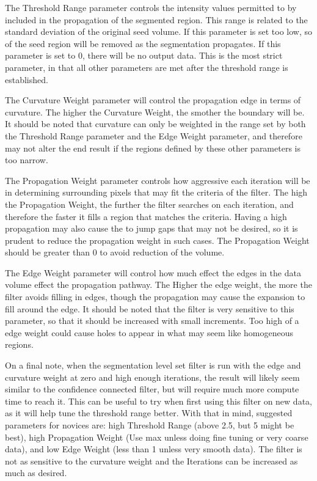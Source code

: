 \documentclass[fleqn,11pt,openany]{book}
\begin{document}
The Threshold Range parameter controls the intensity values permitted to by included in the propagation of the segmented region.  This range is related to the standard deviation of the original seed volume.  If this parameter is set too low, so of the seed region will be removed as the segmentation propagates.  If this parameter is set to 0, there will be no output data.  This is the most strict parameter, in that all other parameters are met after the threshold range is established.  

The Curvature Weight parameter will control the propagation edge in terms of curvature.  The higher the Curvature Weight, the smother the boundary will be.  It should be noted that curvature can only be weighted in the range set by both the Threshold Range parameter and the Edge Weight parameter, and therefore may not alter the end result if the regions defined by these other parameters is too narrow.  

The Propagation Weight parameter controls how aggressive each iteration will be in determining surrounding pixels that may fit the criteria of the filter.  The high the Propagation Weight, the further the filter searches on each iteration, and therefore the faster it fills a region that matches the criteria. Having a high propagation may also cause the to jump gaps that may not be desired, so it is prudent to reduce the propagation weight in such cases.  The Propagation Weight should be greater than 0 to avoid reduction of the volume.  

The Edge Weight parameter will control how much effect the edges in the data volume effect the propagation pathway.  The Higher the edge weight, the more the filter avoids filling in edges, though the propagation may cause the expansion to fill around the edge.  It should be noted that the filter is very sensitive to this parameter, so that it should be increased with small increments.  Too high of a edge weight could cause holes to appear in what may seem like homogeneous regions.  

On a final note, when the segmentation level set filter is run with the edge and curvature weight at zero and high enough iterations, the result will likely seem similar to the confidence connected filter, but will require much more compute time to reach it.  This can be useful to try when first using this filter on new data, as it will help tune the threshold range better.  With that in mind, suggested parameters for novices are: high Threshold Range (above 2.5, but 5 might be best), high Propagation Weight (Use max unless doing fine tuning or very coarse data), and low Edge Weight (less than 1 unless very smooth data).  The filter is not as sensitive to the curvature weight and the Iterations can be increased as much as desired.  
\end{document}

